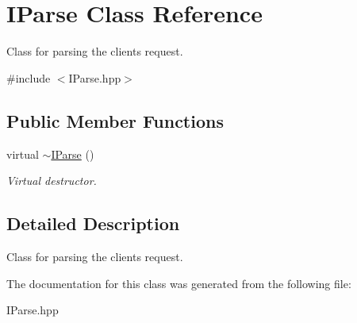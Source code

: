 \hypertarget{class_i_parse}{}\section{I\+Parse Class Reference}
\label{class_i_parse}


Class for parsing the client\textquotesingle{}s request.  




{\ttfamily \#include $<$I\+Parse.\+hpp$>$}

\subsection*{Public Member Functions}
\begin{DoxyCompactItemize}
\item 
\hypertarget{class_i_parse_a72f8e36290a53f75e6922e43ea7baacc}{}virtual \hyperlink{class_i_parse_a72f8e36290a53f75e6922e43ea7baacc}{$\sim$\+I\+Parse} ()\label{class_i_parse_a72f8e36290a53f75e6922e43ea7baacc}

\begin{DoxyCompactList}\small\item\em Virtual destructor. \end{DoxyCompactList}\end{DoxyCompactItemize}


\subsection{Detailed Description}
Class for parsing the client\textquotesingle{}s request. 

The documentation for this class was generated from the following file\+:\begin{DoxyCompactItemize}
\item 
I\+Parse.\+hpp\end{DoxyCompactItemize}
